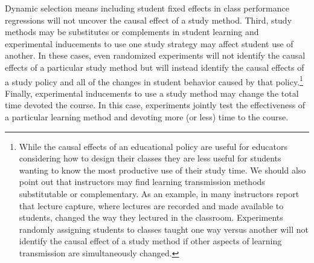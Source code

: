 \documentclass[12pt]{article}
\begin{document}
Dynamic selection means including student fixed effects in class performance regressions will not uncover the causal effect of a study method. Third, study methods may be substitutes or complements in student learning and experimental inducements to use one study strategy may affect student use of another. In these cases, even randomized experiments will not identify the causal effects of a particular study method but will instead identify the causal effects of a study policy and all of the changes in student behavior caused by that policy.\footnote{While the causal effects of an educational policy are useful for educators considering how to design their classes they are less useful for students wanting to know the most productive use of their study time. We should also point out that instructors may find learning transmission methods substitutable or complementary. As an example, in \textcite{msc2019} many instructors report that lecture capture, where lectures are recorded and made available to students, changed the way they lectured in the classroom. Experiments randomly assigning students to classes taught one way versus another will not identify the causal effect of a study method if other aspects of learning transmission are simultaneously changed.} %
Finally, experimental inducements to use a study method may change the total time devoted the course. In this case, experiments jointly test the effectiveness of a particular learning method and devoting more (or less) time to the course.

\end{document}
